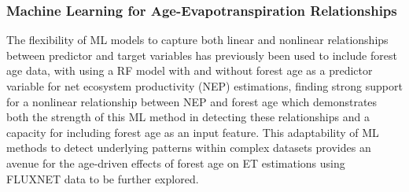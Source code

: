 \documentclass[paper=a4,fontsize=12pt]{scrartcl}
\begin{document}
\subsubsection{Machine Learning for Age-Evapotranspiration Relationships}
The flexibility of ML models to capture both linear and nonlinear relationships between predictor and target variables has previously been used to include forest age data, with \textcite{besnard2018quantifying} using a RF model with and without forest age as a predictor variable for net ecosystem productivity (NEP) estimations, finding strong support for a nonlinear relationship between NEP and forest age which demonstrates both the strength of this ML method in detecting these relationships and a capacity for including forest age as an input feature. This adaptability of ML methods to detect underlying patterns within complex datasets provides an avenue for the age-driven effects of forest age on ET estimations using FLUXNET data to be further explored. 
\end{document}
